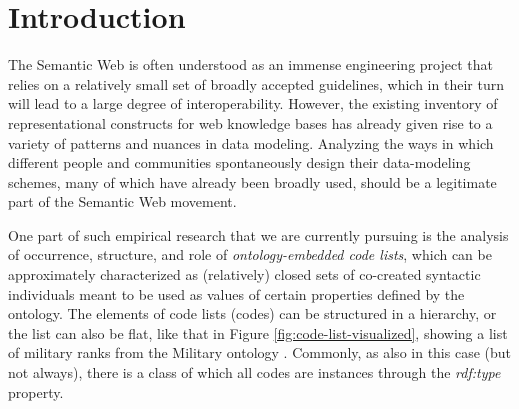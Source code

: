 \section{Introduction}
The Semantic Web is often understood as an immense engineering project that relies on a relatively small set of broadly accepted guidelines, which in their turn  will lead to a large degree of interoperability. However, the existing inventory of representational constructs for web knowledge bases has already given rise to a variety of patterns and nuances in data modeling. Analyzing the ways in which different people and communities spontaneously design their data-modeling schemes, many of which have already been broadly used, should be a legitimate part of the Semantic Web movement.

One part of such empirical research that we are currently pursuing is the analysis of occurrence, structure, and role of \emph{ontology-embedded code lists}, which can be approximately characterized as (relatively) closed sets of co-created syntactic individuals meant to be used as values of certain properties defined by the ontology.
%
The elements of code lists (codes) can be structured in a hierarchy, or the list can also be flat, like that in Figure \ref{fig:code-list-visualized}, showing a list of military ranks from the Military ontology \cite{military_ontology}.
Commonly, as also in this case (but not always), there is a class of which all codes are instances through the \emph{rdf:type} property.

